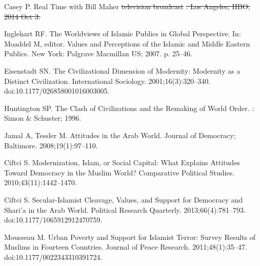\documentclass[10pt,letterpaper]{article}
\providecommand{\DIFaddtex}[1]{{\protect\color{blue}\uwave{#1}}} %
\providecommand{\DIFdeltex}[1]{{\protect\color{red}\sout{#1}}}                      %
\providecommand{\DIFaddbegin}{} %
\providecommand{\DIFaddend}{} %
\providecommand{\DIFdelbegin}{} %
\providecommand{\DIFdelend}{} %
\providecommand{\DIFadd}[1]{\texorpdfstring{\DIFaddtex{#1}}{#1}} %
\providecommand{\DIFdel}[1]{\texorpdfstring{\DIFdeltex{#1}}{}} %
\newcommand{\DIFscaledelfig}{0.5}
\newlength{\DIFdelgraphicswidth} %
\newlength{\DIFdelgraphicsheight} %
\newcommand{\DIFaddincludegraphics}[2][]{{\color{blue}\fbox{\DIFOincludegraphics[#1]{#2}}}} %
\newcommand{\DIFdelincludegraphics}[2][]{%
\sbox{\DIFdelgraphicsbox}{\DIFOincludegraphics[#1]{#2}}%
\settoboxwidth{\DIFdelgraphicswidth}{\DIFdelgraphicsbox} %
\settoboxtotalheight{\DIFdelgraphicsheight}{\DIFdelgraphicsbox} %
\scalebox{\DIFscaledelfig}{%
\parbox[b]{\DIFdelgraphicswidth}{\usebox{\DIFdelgraphicsbox}\\[-\baselineskip] \rule{\DIFdelgraphicswidth}{0em}}\llap{\resizebox{\DIFdelgraphicswidth}{\DIFdelgraphicsheight}{%
\setlength{\unitlength}{\DIFdelgraphicswidth}%
\begin{picture}(1,1)%
\thicklines\linethickness{2pt} %
{\color[rgb]{1,0,0}\put(0,0){\framebox(1,1){}}}%
{\color[rgb]{1,0,0}\put(0,0){\line( 1,1){1}}}%
{\color[rgb]{1,0,0}\put(0,1){\line(1,-1){1}}}%
\end{picture}%
}\hspace*{3pt}}} %
} %
\DeclareRobustCommand{\DIFaddbegin}{\DIFOaddbegin \let\includegraphics\DIFaddincludegraphics} %
\DeclareRobustCommand{\DIFaddend}{\DIFOaddend \let\includegraphics\DIFOincludegraphics} %
\DeclareRobustCommand{\DIFdelbegin}{\DIFOdelbegin \let\includegraphics\DIFdelincludegraphics} %
\DeclareRobustCommand{\DIFdelend}{\DIFOaddend \let\includegraphics\DIFOincludegraphics} %
\begin{document}
\nolinenumbers

%
%
% 
\begin{thebibliography}{10}

Casey P. Real {{Time}} with {{Bill Maher}}\DIFdelbegin %
\DIFdel{television broadcast}%
\DIFdel{. Los Angeles; HBO; 2014 Oct 3.
}\DIFdelend \DIFaddbegin \DIFadd{; 2014.
}\DIFaddend 

Inglehart RF.
\newblock The {{Worldviews}} of {{Islamic Publics}} in {{Global Perspective}}.
\newblock In: Moaddel M, editor. Values and {{Perceptions}} of the {{Islamic}}
  and {{Middle Eastern Publics}}. {New York}: {Palgrave Macmillan US}; 2007. p.
  25--46.

Eisenstadt SN.
\newblock The {{Civilizational Dimension}} of {{Modernity}}: {{Modernity}} as a
  {{Distinct Civilization}}.
\newblock International Sociology. 2001;16(3):320--340.
\newblock doi:{10.1177/026858001016003005}.

Huntington SP.
\newblock The {{Clash}} of {{Civilizations}} and the {{Remaking}} of {{World
  Order}}.
: {Simon \& Schuster}; 1996.

Jamal A, Tessler M.
\newblock Attitudes in the {{Arab World}}.
\newblock Journal of Democracy; Baltimore. 2008;19(1):97--110.

Ciftci S.
\newblock Modernization, {{Islam}}, or {{Social Capital}}: {{What Explains
  Attitudes Toward Democracy}} in the {{Muslim World}}?
\newblock Comparative Political Studies. 2010;43(11):1442--1470.

Ciftci S.
\newblock Secular-{{Islamist Cleavage}}, {{Values}}, and {{Support}} for
  {{Democracy}} and {{Shari}}'a in the {{Arab World}}.
\newblock Political Research Quarterly. 2013;66(4):781--793.
\newblock doi:{10.1177/1065912912470759}.

Mousseau M.
\newblock Urban Poverty and Support for {{Islamist}} Terror: {{Survey}} Results
  of {{Muslims}} in Fourteen Countries.
\newblock Journal of Peace Research. 2011;48(1):35--47.
\newblock doi:{10.1177/0022343310391724}.


\end{thebibliography}
\end{document}
